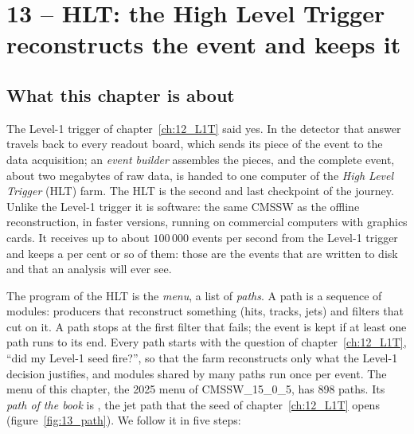 
\chapter{13 -- HLT: the High Level Trigger reconstructs the event and keeps it}
\label{ch:13_HLT}

\section{What this chapter is about}

The Level-1 trigger of chapter~\ref{ch:12_L1T} said yes. In the detector that answer travels back to every readout
board, which sends its piece of the event to the data acquisition; an \emph{event builder} assembles the pieces, and
the complete event, about two megabytes of raw data, is handed to one computer of the \emph{High Level Trigger}
(HLT) farm. The HLT is the second and last checkpoint of the journey. Unlike the Level-1 trigger it is software: the
same CMSSW as the offline reconstruction, in faster versions, running on commercial computers with graphics cards. It
receives up to about $100\,000$ events per second from the Level-1 trigger and keeps a per cent or so of them: those
are the events that are written to disk and that an analysis will ever see.

The program of the HLT is the \emph{menu}, a list of \emph{paths}. A path is a sequence of modules: producers that
reconstruct something (hits, tracks, jets) and filters that cut on it. A path stops at the first filter that fails;
the event is kept if at least one path runs to its end. Every path starts with the question of chapter~\ref{ch:12_L1T},
``did my Level-1 seed fire?'', so that the farm reconstructs only what the Level-1 decision justifies, and modules
shared by many paths run once per event. The menu of this chapter, the 2025 menu of CMSSW\_15\_0\_5, has 898
paths. Its \emph{path of the book} is , the jet path that the seed  of
chapter~\ref{ch:12_L1T} opens (figure~\ref{fig:13_path}). We follow it in five steps:

